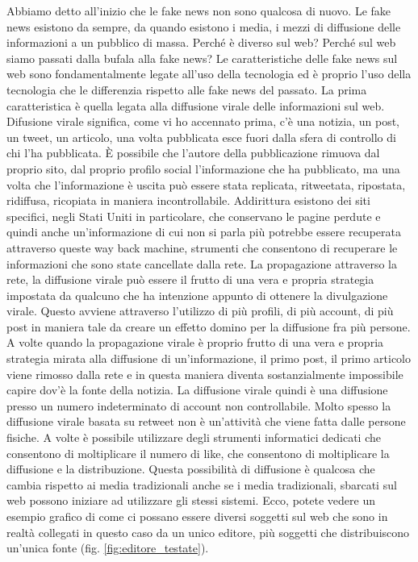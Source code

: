 Abbiamo detto all'inizio che le fake news non sono qualcosa di nuovo. Le fake news esistono da sempre, da quando esistono i media, i mezzi di diffusione delle informazioni a un pubblico di massa. Perché è diverso sul web? Perché sul web siamo passati dalla bufala alla fake news? 
Le caratteristiche delle fake news sul web sono fondamentalmente legate all'uso della tecnologia ed è proprio l'uso della tecnologia che le differenzia rispetto alle fake news del passato. 
La prima caratteristica è quella legata alla diffusione virale delle informazioni sul web. Difusione virale significa, come vi ho accennato prima, c'è una notizia, un post, un tweet, un articolo, una volta pubblicata esce fuori dalla sfera di controllo di chi l'ha pubblicata. È possibile che l'autore della pubblicazione rimuova dal proprio sito, dal proprio profilo social l'informazione che ha pubblicato, ma una volta che l'informazione è uscita può essere stata replicata, ritweetata, ripostata, ridiffusa, ricopiata in maniera incontrollabile. Addirittura esistono dei siti specifici, negli Stati Uniti in particolare, che conservano le pagine perdute e quindi anche un'informazione di cui non si parla più potrebbe essere recuperata attraverso queste way back machine, strumenti che consentono di recuperare le informazioni che sono state cancellate dalla rete. 
La propagazione attraverso la rete, la diffusione virale può essere il frutto di una vera e propria strategia impostata da qualcuno che ha intenzione appunto di ottenere la divulgazione virale. Questo avviene attraverso l'utilizzo di più profili, di più account, di più post in maniera tale da creare un effetto domino per la diffusione fra più persone. A volte quando la propagazione virale è proprio frutto di una vera e propria strategia mirata alla diffusione di un'informazione, il primo post, il primo articolo viene rimosso dalla rete e in questa maniera diventa sostanzialmente impossibile capire dov'è la fonte della notizia. 
La diffusione virale quindi è una diffusione presso un numero indeterminato di account non controllabile. Molto spesso la diffusione virale basata su retweet non è un'attività che viene fatta dalle persone fisiche. A volte è possibile utilizzare degli strumenti informatici dedicati che consentono di moltiplicare il numero di like, che consentono di moltiplicare la diffusione e la distribuzione. 
Questa possibilità di diffusione è qualcosa che cambia rispetto ai media tradizionali anche se i media tradizionali, sbarcati sul web possono iniziare ad utilizzare gli stessi sistemi. 
Ecco, potete vedere un esempio grafico di come ci possano essere diversi soggetti sul web che sono in realtà collegati in questo caso da un unico editore, più soggetti che distribuiscono un'unica fonte (fig. \ref{fig:editore_testate}). 

